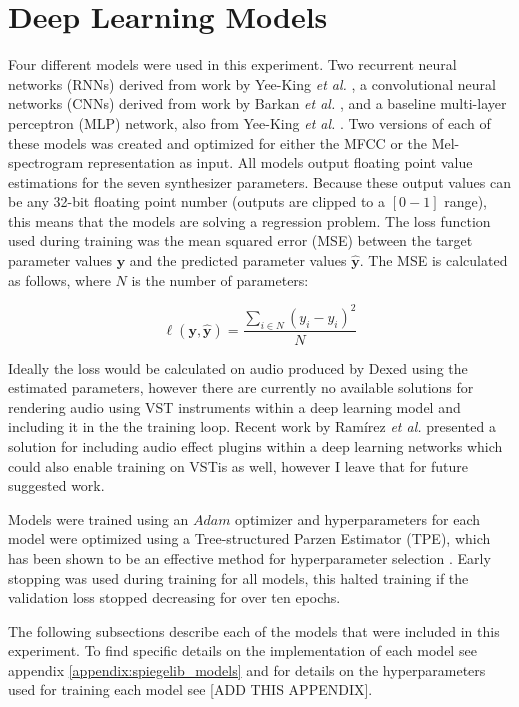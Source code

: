 \section{Deep Learning Models}
Four different models were used in this experiment. Two recurrent neural networks (RNNs) derived from work by Yee-King \textit{et al.} \cite{yee2018automatic}, a convolutional neural networks (CNNs) derived from work by Barkan \textit{et al.} \cite{barkan2019inversynth}, and a baseline multi-layer perceptron (MLP) network, also from Yee-King \textit{et al.} \cite{yee2018automatic}. Two versions of each of these models was created and optimized for either the MFCC or the Mel-spectrogram representation as input. All models output floating point value estimations for the seven synthesizer parameters. Because these output values can be any 32-bit floating point number (outputs are clipped to a $[0-1]$ range), this means that the models are solving a regression problem. The loss function used during training was the mean squared error (MSE) between the target parameter values $\textbf{y}$ and the predicted parameter values $\hat{\textbf{y}}$. The MSE is calculated as follows, where $N$ is the number of parameters:

\begin{equation}\label{equation:mse}
    \ell(\textbf{y}, \hat{\textbf{y}}) = \frac{\sum_{i \in N}{(y_i - \hat{y_i})^2}}{N}
\end{equation}

Ideally the loss would be calculated on audio produced by Dexed using the estimated parameters, however there are currently no available solutions for rendering audio using VST instruments within a deep learning model and including it in the the training loop. Recent work by Ramírez \textit{et al.} presented a solution for including audio effect plugins within a deep learning networks \cite{ramirez2021differentiable} which could also enable training on VSTis as well, however I leave that for future suggested work. 

Models were trained using an $Adam$ optimizer \cite{kingma2014adam} and hyperparameters for each model were optimized using a  Tree-structured Parzen Estimator (TPE), which has been shown to be an effective method for hyperparameter selection \cite{bergstra2011algorithms}. Early stopping was used during training for all models, this halted training if the validation loss stopped decreasing for over ten epochs.

The following subsections describe each of the models that were included in this experiment. To find specific details on the implementation of each model see appendix \ref{appendix:spiegelib_models} and for details on the hyperparameters used for training each model see [ADD THIS APPENDIX].

